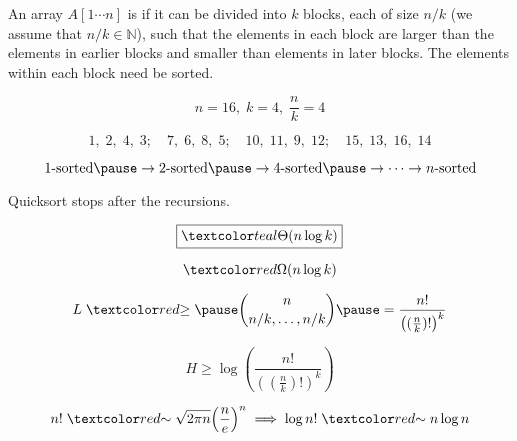 
\begin{frame}{}
  \centerline{}
\end{frame}

\begin{frame}{}
  \begin{definition}
    An array $A[1 \cdots n]$ is  if it can be divided into $k$ blocks, 
    each of size $n/k$ (we assume that $n/k \in \mathbb{N}$), 
    such that the elements in each block are larger than the elements 
    in earlier blocks and smaller than elements in later blocks. 
    The elements within each block need  be sorted.
  \end{definition}

  \[
    n = 16,\; k = 4,\; \frac{n}{k} = 4
  \]

  \[
    1,\;2,\;4,\;3;\quad 7,\;6,\;8,\;5;\quad 10,\;11,\;9,\;12;\quad 15,\;13,\;16,\;14
  \]
\end{frame}

\begin{frame}{}
  \centerline{}

  \pause
  \[
    1\text{-sorted} \pause \to 2\text{-sorted} \pause \to 4\text{-sorted} \pause \to \cdots \to n\text{-sorted}
  \]

  \pause
  \centerline{Quicksort  stops after the  recursions.}

  \pause
  \vspace{0.50cm}
  \[
    \boxed{\teal{\Theta(n \log k)}}
  \]
\end{frame}

\begin{frame}{}
  \[
    \red{\Omega(n \log k)}
  \]

  \pause
  \[
    L \;\red{\ge}\; \pause\binom{n}{n/k, \ldots, n/k} \pause = \frac{n!}{\left( (\frac{n}{k})! \right)^{k}}
  \]


  \pause
  \[
    H \ge \log \left(\frac{n!}{\left( (\frac{n}{k})! \right)^{k}} \right)
  \]

  \pause
  \vspace{0.30cm}
  \[
    n! \;\red{\sim}\; \sqrt{2 \pi n} \Big(\frac{n}{e}\Big)^{n} \implies \log n! \;\red{\sim}\; n \log n
  \]
\end{frame}


